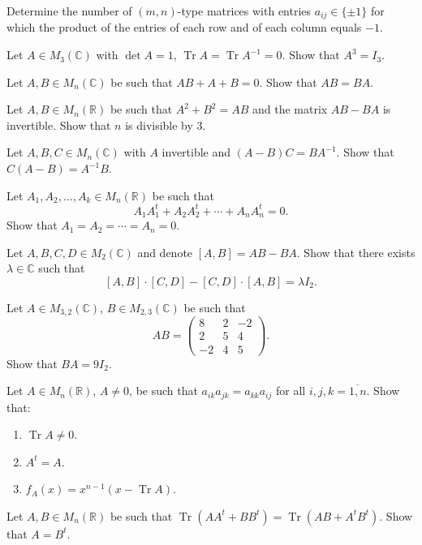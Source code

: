 \documentclass[12pt]{article}
\begin{document}
\begin{problems}
\item Determine the number of $(m,n)$-type matrices with entries $a_{ij} \in \{\pm 1\}$ for which the product of the entries of each row and of each column equals $-1$.

\item Let $A \in M_3(\mathbb{C})$ with $\det A = 1$, $\operatorname{Tr} A = \operatorname{Tr} A^{-1} = 0$. Show that $A^3 = I_3$.

\item Let $A, B \in M_n(\mathbb{C})$ be such that $AB + A + B = 0$. Show that $AB = BA$.

\item Let $A, B \in M_n(\mathbb{R})$ be such that $A^2 + B^2 = AB$ and the matrix $AB - BA$ is invertible. Show that $n$ is divisible by $3$.

\item Let $A, B, C \in M_n(\mathbb{C})$ with $A$ invertible and $(A-B)C = BA^{-1}$. Show that $C(A-B) = A^{-1}B$.

\item Let $A_1, A_2, \ldots, A_k \in M_n(\mathbb{R})$ be such that
$$A_1 A_1^t + A_2 A_2^t + \cdots + A_n A_n^t = 0.$$
Show that $A_1 = A_2 = \cdots = A_n = 0$.

\item Let $A, B, C, D \in M_2(\mathbb{C})$ and denote $[A,B] = AB - BA$. Show that there exists $\lambda \in \mathbb{C}$ such that
$$[A,B]\cdot[C,D] - [C,D]\cdot[A,B] = \lambda I_2.$$

\item Let $A \in M_{3,2}(\mathbb{C})$, $B \in M_{2,3}(\mathbb{C})$ be such that
$$AB = \begin{pmatrix} 8 & 2 & -2 \\ 2 & 5 & 4 \\ -2 & 4 & 5 \end{pmatrix}.$$
Show that $BA = 9 I_2$.

\item Let $A \in M_n(\mathbb{R})$, $A \neq 0$, be such that $a_{ik} a_{jk} = a_{kk} a_{ij}$ for all $i,j,k = \overline{1,n}$. Show that:
\begin{enumerate}[label=(\alph*)]
\item $\operatorname{Tr} A \neq 0$.
\item $A^t = A$.
\item $f_A(x) = x^{n-1}(x - \operatorname{Tr} A)$.
\end{enumerate}

\item Let $A, B \in M_n(\mathbb{R})$ be such that $\operatorname{Tr}(AA^t + BB^t) = \operatorname{Tr}(AB + A^tB^t)$. Show that $A = B^t$.


\end{problems}
\end{document}
